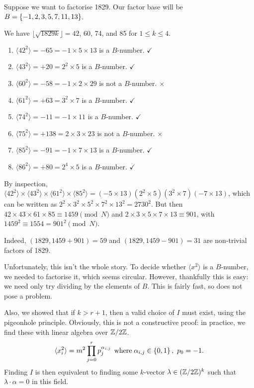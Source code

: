 \documentclass{article}
\begin{document}
\begin{example}[Factorising 1829]
    Suppose we want to factorise 1829. Our factor base will be $B = \left\lbrace -1, 2, 3, 5, 7, 11, 13 \right\rbrace$.
    
    We have $\lfloor \sqrt{1829k} \rfloor = 42$, 60, 74, and 85 for $1 \leq k \leq 4$.
    \begin{enumerate}
		\item[]$\langle{42^2}\rangle = -65 = -1 \times 5 \times 13$ is a $B$-number.
		\hfill $\checkmark$
		\item[]$\langle{43^2}\rangle = +20 = 2^2 \times 5$ is a $B$-number.
		\hfill $\checkmark$
		\item[]$\langle{60^2}\rangle = -58 = -1 \times 2 \times 29$ is not a $B$-number.
		\hfill $\times$
		\item[]$\langle{61^2}\rangle = +63 = 3^2 \times 7$ is a $B$-number.
		\hfill $\checkmark$
		\item[]$\langle{74^2}\rangle = -11 = -1 \times 11$ is a $B$-number.
		\hfill $\checkmark$
		\item[]$\langle{75^2}\rangle = +138 = 2 \times 3 \times 23$ is not a $B$-number.
		\hfill $\times$
		\item[]$\langle{85^2}\rangle = -91 = -1 \times 7 \times 13$ is a $B$-number.
		\hfill $\checkmark$
		\item[]$\langle{86^2}\rangle = +80 = 2^4 \times 5$ is a $B$-number.
		\hfill $\checkmark$
    \end{enumerate}
    By inspection, $\langle{42^2}\rangle \times \langle{43^2}\rangle \times \langle{61^2}\rangle \times \langle{85^2}\rangle = (-5 \times 13)(2^2 \times 5)(3^2 \times 7)(-7 \times 13)$, which can be written as $2^2 \times 3^2 \times 5^2 \times 7^2 \times 13^2 = 2730^2$. But then $42 \times 43 \times 61 \times 85 \equiv 1459 \pmod N$ and $2 \times 3 \times 5 \times 7 \times 13 \equiv 901$, with $1459^2 \equiv 1554 = 901^2 \pmod N$.
    
    Indeed, $(1829, 1459 + 901) = 59$ and $(1829, 1459 - 901) = 31$ are non-trivial factors of 1829.
\end{example}

Unfortunately, this isn't the whole story. To decide whether $\langle x^2 \rangle$ is a $B$-number, we needed to factorise it, which seems circular. However, thankfully this is easy: we need only try dividing by the elements of $B$. This is fairly fast, so does not pose a problem.

Also, we showed that if $k > r+1$, then a valid choice of $I$ must exist, using the pigeonhole principle. Obviously, this is not a constructive proof: in practice, we find these with linear algebra over $\mathbb{Z}/2\mathbb{Z}$.
\[
\langle x_i^2 \rangle =
m^2 \prod_{j=0}^r p_j^{\alpha_{i,j}}
\mathrel{\, \text{where}} \alpha_{i,j} \in \left\lbrace 0,1 \right\rbrace, \ p_0 = -1.
\]
Finding $I$ is then equivalent to finding some $k$-vector $\lambda \in (\mathbb{Z}/2\mathbb{Z})^k$ such that $\lambda \cdot \alpha = 0$ in this field.
\end{document}

